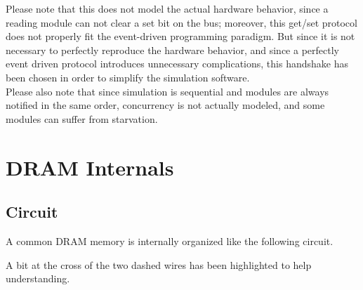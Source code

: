 \documentclass[a4paper,12pt]{article}
\begin{document}
Please note that this does not model the actual hardware behavior, since a reading module can not clear a set bit on the bus;
moreover, this get/set protocol does not properly fit the event-driven programming paradigm.
But since it is not necessary to perfectly reproduce the hardware behavior, and since a perfectly event driven protocol introduces unnecessary complications, this handshake has been chosen in order to simplify the simulation software.\\

Please also note that since simulation is sequential and modules are always notified in the same order, concurrency is not actually modeled, and some modules can suffer from starvation.

\section{DRAM Internals}
\subsection{Circuit}
A common DRAM memory is internally organized like the following circuit.

A bit at the cross of the two dashed wires has been highlighted to help understanding.
\end{document}
